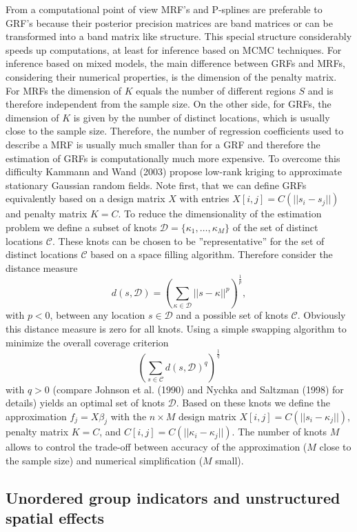 \documentclass[11pt,a4paper,twoside]{bayesxarticle}
\begin{document}
From a computational point of view MRF's and P-splines are
preferable to GRF's because their posterior precision matrices are
band matrices or can be transformed into a band matrix like
structure. This special structure considerably speeds up
computations, at least for inference based on MCMC techniques. For
inference based on mixed models, the main difference between GRFs
and MRFs, considering their numerical properties, is the dimension
of the penalty matrix. For MRFs the dimension of $K$ equals the
number of different regions $S$ and is therefore independent from
the sample size. On the other side, for GRFs, the dimension of $K$
is given by the number of distinct locations, which is usually close
to the sample size. Therefore, the number of regression coefficients
used to describe a MRF is usually much smaller than for a GRF and
therefore the estimation of GRFs is computationally much more
expensive. To overcome this difficulty Kammann and Wand (2003)
propose low-rank kriging to approximate stationary Gaussian random
fields. Note first, that we can define GRFs equivalently based on a
design matrix $X$ with entries $X[i,j]=C(||s_i-s_j||)$ and penalty
matrix $K=C$. To reduce the dimensionality of the estimation problem
we define a subset of knots
$\mathcal{D}=\{\kappa_1,\ldots,\kappa_M\}$ of the set of distinct
locations $\mathcal{C}$. These knots can be chosen to be
''representative'' for the set of distinct locations $\mathcal{C}$
based on a space filling algorithm. Therefore consider the distance
measure
\[d(s,\mathcal{D})=\left(\sum_{\kappa\in\mathcal{D}}||s-\kappa||^p\right)^{\frac{1}{p}},\]
with $p<0$, between any location $s\in\mathcal{D}$ and a possible
set of knots $\mathcal{C}$. Obviously this distance measure is
zero for all knots. Using a simple swapping algorithm to minimize
the overall coverage criterion
\[\left(\sum_{s\in\mathcal{C}}d(s,\mathcal{D})^q\right)^{\frac{1}{q}}\]
with $q>0$ (compare Johnson et al. (1990) and Nychka and Saltzman
(1998) for details) yields an optimal set of knots $\mathcal{D}$.
Based on these knots we define the approximation $f_{j}=X\beta_j$
with the $n\times M$ design matrix $X[i,j]=C(||s_i-\kappa_j||)$,
penalty matrix $K=C$, and $C[i,j]=C(||\kappa_i-\kappa_j||)$. The
number of knots $M$ allows to control the trade-off between accuracy
of the approximation ($M$ close to the sample size) and numerical
simplification ($M$ small).

\subsection{Unordered group indicators and unstructured spatial effects}
\label{random}
\end{document}
